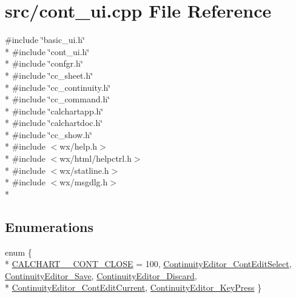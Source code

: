\hypertarget{a00192}{\section{src/cont\-\_\-ui.cpp File Reference}
\label{a00192}
}
{\ttfamily \#include \char`\"{}basic\-\_\-ui.\-h\char`\"{}}\\*
{\ttfamily \#include \char`\"{}cont\-\_\-ui.\-h\char`\"{}}\\*
{\ttfamily \#include \char`\"{}confgr.\-h\char`\"{}}\\*
{\ttfamily \#include \char`\"{}cc\-\_\-sheet.\-h\char`\"{}}\\*
{\ttfamily \#include \char`\"{}cc\-\_\-continuity.\-h\char`\"{}}\\*
{\ttfamily \#include \char`\"{}cc\-\_\-command.\-h\char`\"{}}\\*
{\ttfamily \#include \char`\"{}calchartapp.\-h\char`\"{}}\\*
{\ttfamily \#include \char`\"{}calchartdoc.\-h\char`\"{}}\\*
{\ttfamily \#include \char`\"{}cc\-\_\-show.\-h\char`\"{}}\\*
{\ttfamily \#include $<$wx/help.\-h$>$}\\*
{\ttfamily \#include $<$wx/html/helpctrl.\-h$>$}\\*
{\ttfamily \#include $<$wx/statline.\-h$>$}\\*
{\ttfamily \#include $<$wx/msgdlg.\-h$>$}\\*
\subsection*{Enumerations}
\begin{DoxyCompactItemize}
\item 
enum \{ \\*
\hyperlink{a00192_abc6126af1d45847bc59afa0aa3216b04aa0ad6c8ff232ebd34725f3eafb1f4501}{C\-A\-L\-C\-H\-A\-R\-T\-\_\-\-\_\-\-C\-O\-N\-T\-\_\-\-C\-L\-O\-S\-E} = 100, 
\hyperlink{a00192_abc6126af1d45847bc59afa0aa3216b04a9586fcfbf81c6d77ca8e70dff0bc9f25}{Continuity\-Editor\-\_\-\-Cont\-Edit\-Select}, 
\hyperlink{a00192_abc6126af1d45847bc59afa0aa3216b04a081aebf31b57c86a1229613251698f34}{Continuity\-Editor\-\_\-\-Save}, 
\hyperlink{a00192_abc6126af1d45847bc59afa0aa3216b04a30826ac2558e3178feca97c3b07e9990}{Continuity\-Editor\-\_\-\-Discard}, 
\\*
\hyperlink{a00192_abc6126af1d45847bc59afa0aa3216b04aacef6bbcb7b89e3b5affe60511315bde}{Continuity\-Editor\-\_\-\-Cont\-Edit\-Current}, 
\hyperlink{a00192_abc6126af1d45847bc59afa0aa3216b04a1b1898f80fab252c0ead5a7149e357b5}{Continuity\-Editor\-\_\-\-Key\-Press}
 \}
\end{DoxyCompactItemize}


